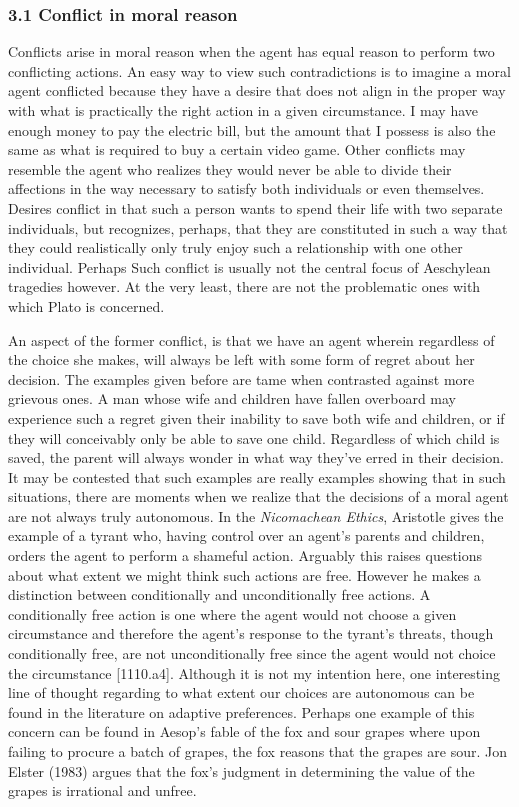 \documentclass[
  letterpaper,
  DIV=11,
  numbers=noendperiod]{scrartcl}
\theoremstyle{remark}
\begin{document}
\subsubsection{3.1 Conflict in moral
reason}\label{conflict-in-moral-reason}

Conflicts arise in moral reason when the agent has equal reason to
perform two conflicting actions. An easy way to view such contradictions
is to imagine a moral agent conflicted because they have a desire that
does not align in the proper way with what is practically the right
action in a given circumstance. I may have enough money to pay the
electric bill, but the amount that I possess is also the same as what is
required to buy a certain video game. Other conflicts may resemble the
agent who realizes they would never be able to divide their affections
in the way necessary to satisfy both individuals or even themselves.
Desires conflict in that such a person wants to spend their life with
two separate individuals, but recognizes, perhaps, that they are
constituted in such a way that they could realistically only truly enjoy
such a relationship with one other individual. Perhaps Such conflict is
usually not the central focus of Aeschylean tragedies however. At the
very least, there are not the problematic ones with which Plato is
concerned.

An aspect of the former conflict, is that we have an agent wherein
regardless of the choice she makes, will always be left with some form
of regret about her decision. The examples given before are tame when
contrasted against more grievous ones. A man whose wife and children
have fallen overboard may experience such a regret given their inability
to save both wife and children, or if they will conceivably only be able
to save one child. Regardless of which child is saved, the parent will
always wonder in what way they've erred in their decision. It may be
contested that such examples are really examples showing that in such
situations, there are moments when we realize that the decisions of a
moral agent are not always truly autonomous. In the \emph{Nicomachean
Ethics}, Aristotle gives the example of a tyrant who, having control
over an agent's parents and children, orders the agent to perform a
shameful action. Arguably this raises questions about what extent we
might think such actions are free. However he makes a distinction
between conditionally and unconditionally free actions. A conditionally
free action is one where the agent would not choose a given circumstance
and therefore the agent's response to the tyrant's threats, though
conditionally free, are not unconditionally free since the agent would
not choice the circumstance {[}1110.a4{]}. Although it is not my
intention here, one interesting line of thought regarding to what extent
our choices are autonomous can be found in the literature on adaptive
preferences. Perhaps one example of this concern can be found in Aesop's
fable of the fox and sour grapes where upon failing to procure a batch
of grapes, the fox reasons that the grapes are sour. Jon Elster (1983)
argues that the fox's judgment in determining the value of the grapes is
irrational and unfree.
\end{document}
